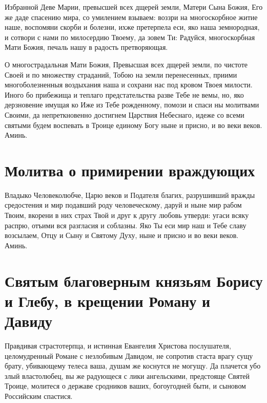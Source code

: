 Избранной Деве Марии, превысшей всех дщерей земли, Матери Сына Божия, Его же даде спасению мира, со умилением взываем: воззри на многоскорбное житие наше, воспомяни скорби и болезни, ихже претерпела еси, яко наша земнородная, и сотвори с нами по милосердию Твоему, да зовем Ти: Радуйся, многоскорбная Мати Божия, печаль нашу в радость претворяющая.




О многострадальная Мати Божия, Превысшая всех дщерей земли, по чистоте Своей и по множеству страданий, Тобою на земли перенесенных, приими многоболезненныя воздыхания наша и сохрани нас под кровом Твоея милости. Иного бо прибежища и теплаго предстательства разве Тебе не вемы, но, яко дерзновение имущая ко Иже из Тебе рожденному, помози и спаси ны молитвами Своими, да непреткновенно достигнем Царствия Небеснаго, идеже со всеми святыми будем воспевать в Троице единому Богу ныне и присно, и во веки веков. Аминь.


\section{Молитва о примирении враждующих}
 


Владыко Человеколюбче, Царю веков и Подателя благих, разрушивший вражды средостения и мир подавший роду человеческому, даруй и ныне мир рабом Твоим, вкорени в них страх Твой и друг к другу любовь утверди: угаси всяку распрю, отъими вся разгласия и соблазны. Яко Ты еси мир наш и Тебе славу возсылаем, Отцу и Сыну и Святому Духу, ныне и присно и во веки веков. Аминь.
\mychapterending


 

\section{Святым благоверным князьям Борису и Глебу, в крещении Роману и  Давиду}
 





Правдивая страстотерпца, и истинная Евангелия Христова послушателя, целомудренный Романе с незлобивым Давидом, не сопротив стаста врагу сущу брату, убивающему телеса ваша, душам же коснутся не могущу. Да плачется убо злый властолюбец, вы же радующеся с лики ангельскими, предстояще Святей Троице, молитеся о державе сродников ваших, богоугодней быти, и сыновом Российским спастися.


